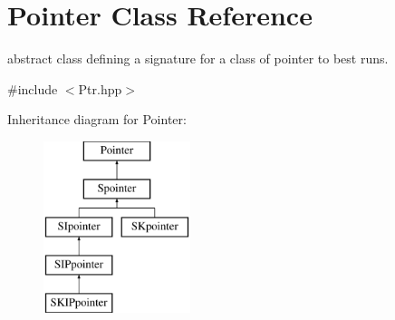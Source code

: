 \hypertarget{classPointer}{}\section{Pointer Class Reference}
\label{classPointer}


abstract class defining a signature for a class of pointer to best runs.  




{\ttfamily \#include $<$Ptr.\+hpp$>$}

Inheritance diagram for Pointer\+:\begin{figure}[H]
\begin{center}
\leavevmode
\includegraphics[height=5.000000cm]{classPointer}
\end{center}
\end{figure}
